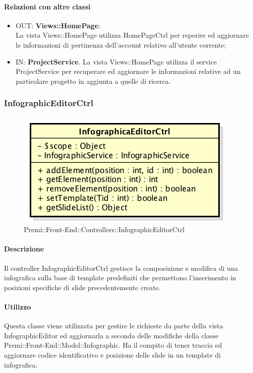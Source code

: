\paragraph{Relazioni con altre classi}
\begin{itemize}
	\item OUT: \textbf{Views::HomePage}:\\
	La vista Views::HomePage utilizza HomePageCtrl per reperire ed aggiornare le informazioni di pertinenza dell'account relativo all'utente corrente;
	\item IN: \textbf{ProjectService}.
	La vista Views::HomePage utilizza il service ProjectService per recuperare ed aggiornare le informazioni relative ad un particolare progetto in aggiunta a quelle di ricerca.
\end{itemize}

\subsubsection{InfographicEditorCtrl}
\begin{figure}[h]
	\centering
	\includegraphics[width=0.4\linewidth]{img/premi_front_end_controllers_infographiceditorctrl}
	\caption[Premi::Front-End::Controllers::InfographicEditorCtrl]{Premi::Front-End::Controllers::InfographicEditorCtrl}
\end{figure}
	\paragraph{Descrizione}
		Il controller InfographicEditorCtrl gestisce la composizione e modifica di una infografica sulla base di template predefiniti che permettono l'inserimento in posizioni specifiche di slide precedentemente create.

	\paragraph{Utilizzo}

		Questa classe viene utilizzata per gestire le richieste da parte della vista InfographicEditor ed aggiornarla a seconda delle modifiche della classe Premi::Front-End::Model::Infographic.
		Ha il compito di tener traccia ed aggiornare codice identificativo e posizione delle slide in un template di infografica.
